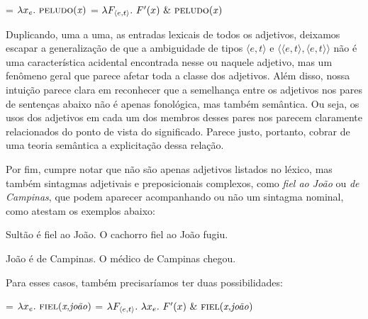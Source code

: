 \begin{exe}
	\ex
	\begin{xlist}
		\ex {} = $\lambda x_{e}.\ \predica{peludo}{x}$
		\ex {} = $\lambda F_{\langle e,t\rangle}.\ F'(x)\ \&\ \text{\textsc{peludo}(\textit{x})}$
	\end{xlist}
\end{exe}



\n Duplicando, uma a uma,  as entradas lexicais de todos os
adjetivos, deixamos escapar a generalização de que a ambiguidade
de tipos $\langle e,t\rangle$ e $\langle\langle e,t\rangle,\langle
e,t\rangle\rangle$ não é uma característica acidental encontrada
nesse ou naquele adjetivo, mas um fenômeno geral que parece afetar
toda a classe dos adjetivos. Além disso, nossa intuição parece
clara em reconhecer que a semelhança entre os adjetivos nos pares
de sentenças abaixo não é apenas fonológica, mas também semântica. Ou seja, os usos dos adjetivos em cada um dos membros desses pares
nos parecem claramente relacionados do ponto de vista do
significado. Parece justo, portanto, cobrar de uma teoria semântica a explicitação dessa relação.

Por fim, cumpre notar que não são apenas adjetivos listados no
léxico, mas também sintagmas adjetivais e preposicionais complexos, como
\textit{fiel ao João} ou \textit{de Campinas}, que podem aparecer acompanhando ou não um
sintagma nominal, como atestam os exemplos abaixo:

\begin{exe}
\ex\label{sas}
\begin{xlist}
\ex Sultão é fiel ao João.\label{sasa}
\ex O cachorro fiel ao João fugiu.\label{sasb}
\end{xlist}
\end{exe}

\begin{exe}
	\ex\label{sasp}
	\begin{xlist}
		\ex João é de Campinas.\label{sasap}
		\ex O médico de Campinas chegou.\label{sasbp}
	\end{xlist}
\end{exe}

\n Para esses casos, também precisaríamos ter duas possibilidades:

\begin{exe}
	\ex
	\begin{xlist}
		\ex {} = $\lambda x_{e}.\ \predica{fiel}{x,joão}$
		\ex {} = $\lambda F_{\langle e,t\rangle}.\ \lambda x_{e}.\ F'(x)\ \&\ \predica{fiel}{x,joão}$
	\end{xlist}
\end{exe}

